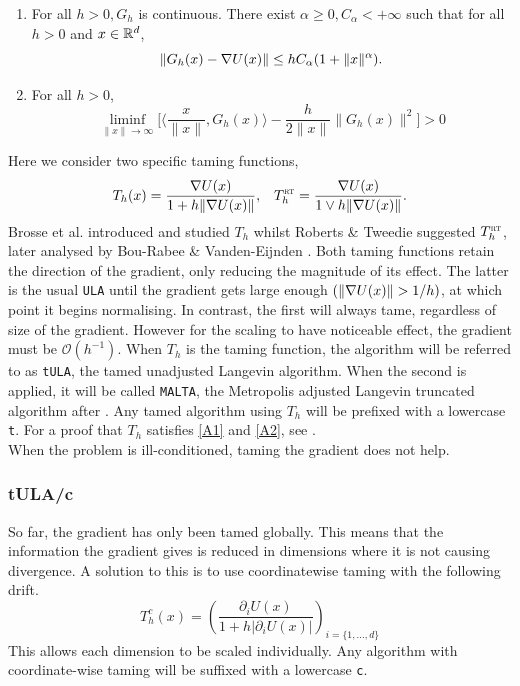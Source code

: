 \begin{enumerate}[label={\bf A{\arabic*}}]
	\item  For all \(h>0, G_h\) is continuous. There exist \(\alpha\geq 0, C_{\alpha}<+\infty\) such that for all \(h >0 \) and \(x \in \mathbb{R}^d\),
		\[\|G_h(x)-\nabla U(x)\| \leq hC_{\alpha}(1+\|x\|^{\alpha}).\]\label{A1}
	\item For all \(h>0\),
		\[ \liminf_{\|x\|\to \infty} \bigg\lbrack \bigg\langle \frac{x}{\|x\|}, G_h(x)\bigg\rangle - \frac{h}{2\|x\|}\|G_h(x)\|^2\bigg\rbrack >0\]\label{A2}
\end{enumerate}
Here we consider two specific taming functions,
 \begin{align*}
 T_h(x) = \frac{\nabla U(x)}{1+h\|\nabla U(x)\|}, &&  T^{\text{\sc \tiny RT}}_h = \frac{\nabla U(x)}{1\vee h\|\nabla U(x)\|}.
 \end{align*}
Brosse et al. introduced and studied \(T_h\) whilst Roberts \& Tweedie suggested \(T^{\text{\sc \tiny RT}}_h\), later analysed by Bou-Rabee \& Vanden-Eijnden \cite{BV10MALTA,Brosse18tULA,RT96}. Both taming functions retain the direction of the gradient, only reducing the magnitude of its effect. The latter is the usual \texttt{ULA} until the gradient gets large enough \((\|\grad U(x)\|> 1/h)\), at which point it begins normalising. In contrast, the first will always tame, regardless of size of the gradient. However for the scaling to have noticeable effect, the gradient must be \(\mathcal{O}(h^{-1})\).
When \(T_h\) is the taming function, the algorithm will be referred to as \texttt{tULA}, the tamed unadjusted Langevin algorithm. When the second is applied, it will be called \texttt{MALTA}, the Metropolis adjusted Langevin truncated algorithm after \cite{RT96}. Any tamed algorithm using \(T_h\) will be prefixed with a lowercase \texttt{t}. For a proof that \(T_h\) satisfies \ref{A1} and \ref{A2}, see \cite[Lemma~2]{Brosse18tULA}.
\\
When the problem is ill-conditioned, taming the gradient does not help. 
\subsubsection{tULA/c}
So far, the gradient has only been tamed globally. This means that the information the gradient gives is reduced in dimensions where it is not causing divergence. A solution to this is to use coordinatewise taming with the following drift.
  \[T^c_{h}(x) =\left(\frac{\partial_i U(x)}{1+h|\partial_i U(x)|}\right)_{i=\lbrace 1, \dots, d\rbrace} \]
This allows each dimension to be scaled individually. Any algorithm with coordinate-wise taming will be suffixed with a lowercase \texttt{c}.


